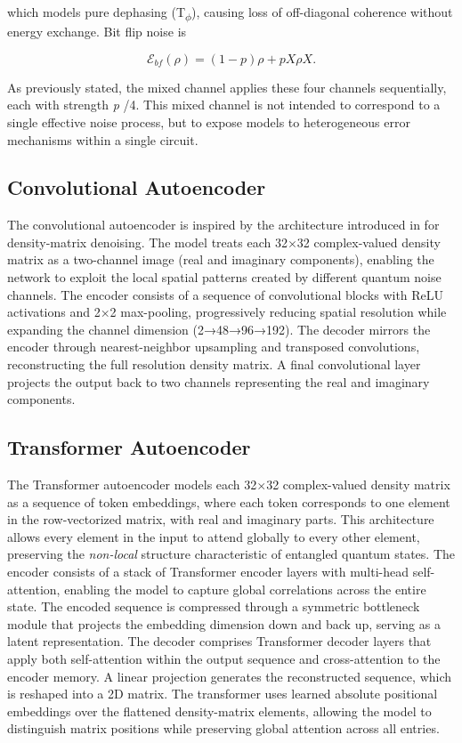 \documentclass[a4paper, 11pt, colorlinks=true, citecolor=., linkcolor=black, urlcolor=black]{article}
\begin{document}
which models pure dephasing (T\textsubscript{\(\phi\)}), causing loss of off-diagonal coherence without energy exchange.
Bit flip noise is

$$
\mathcal{E}_{bf}(\rho) = (1-p)\rho + p X \rho X.
$$

As previously stated, the mixed channel applies these four channels sequentially, each with strength \emph{p} /4. This mixed channel is not intended to correspond to a single effective noise process, but to expose models to heterogeneous error mechanisms within a single circuit.
\subsection{Convolutional Autoencoder}
\label{sec:org5e685f1}
The convolutional autoencoder is inspired by the architecture introduced in \autocite{kendre2025machinelearningquantumnoise} for density-matrix denoising. The model treats each 32\(\times\)32 complex-valued density matrix as a two-channel image (real and imaginary components), enabling the network to exploit the local spatial patterns created by different quantum noise channels. The encoder consists of a sequence of convolutional blocks with ReLU activations and 2×2 max-pooling, progressively reducing spatial resolution while expanding the channel dimension (2→48→96→192). The decoder mirrors the encoder through nearest-neighbor upsampling and transposed convolutions, reconstructing the full resolution density matrix. A final convolutional layer projects the output back to two channels representing the real and imaginary components.
\subsection{Transformer Autoencoder}
\label{sec:org5fa64d1}
The Transformer autoencoder models each 32\(\times\)32 complex-valued density matrix as a sequence of token embeddings, where each token corresponds to one element in the row-vectorized matrix, with real and imaginary parts. This architecture allows every element in the input to attend globally to every other element, preserving the \emph{non-local} structure characteristic of entangled quantum states. The encoder consists of a stack of Transformer encoder layers with multi-head self-attention, enabling the model to capture global correlations across the entire state. The encoded sequence is compressed through a symmetric bottleneck module that projects the embedding dimension down and back up, serving as a latent representation. The decoder comprises Transformer decoder layers that apply both self-attention within the output sequence and cross-attention to the encoder memory. A linear projection generates the reconstructed sequence, which is reshaped into a 2D matrix. The transformer uses learned absolute positional embeddings over the flattened density-matrix elements, allowing the model to distinguish matrix positions while preserving global attention across all entries.
\end{document}
